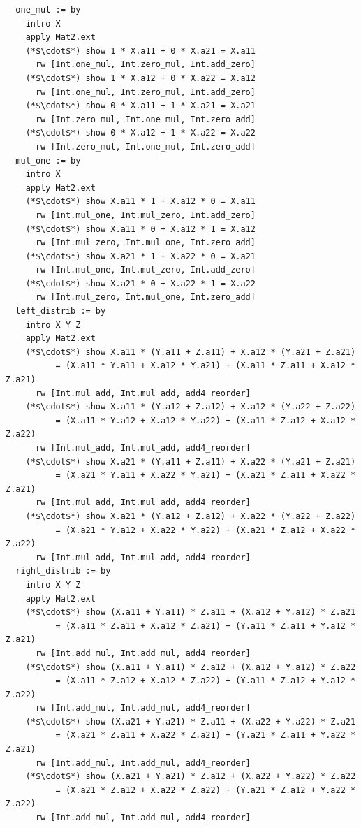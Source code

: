 \begin{lstlisting}
  one_mul := by
    intro X
    apply Mat2.ext
    (*$\cdot$*) show 1 * X.a11 + 0 * X.a21 = X.a11
      rw [Int.one_mul, Int.zero_mul, Int.add_zero]
    (*$\cdot$*) show 1 * X.a12 + 0 * X.a22 = X.a12
      rw [Int.one_mul, Int.zero_mul, Int.add_zero]
    (*$\cdot$*) show 0 * X.a11 + 1 * X.a21 = X.a21
      rw [Int.zero_mul, Int.one_mul, Int.zero_add]
    (*$\cdot$*) show 0 * X.a12 + 1 * X.a22 = X.a22
      rw [Int.zero_mul, Int.one_mul, Int.zero_add]
  mul_one := by
    intro X
    apply Mat2.ext
    (*$\cdot$*) show X.a11 * 1 + X.a12 * 0 = X.a11
      rw [Int.mul_one, Int.mul_zero, Int.add_zero]
    (*$\cdot$*) show X.a11 * 0 + X.a12 * 1 = X.a12
      rw [Int.mul_zero, Int.mul_one, Int.zero_add]
    (*$\cdot$*) show X.a21 * 1 + X.a22 * 0 = X.a21
      rw [Int.mul_one, Int.mul_zero, Int.add_zero]
    (*$\cdot$*) show X.a21 * 0 + X.a22 * 1 = X.a22
      rw [Int.mul_zero, Int.mul_one, Int.zero_add]
  left_distrib := by
    intro X Y Z
    apply Mat2.ext
    (*$\cdot$*) show X.a11 * (Y.a11 + Z.a11) + X.a12 * (Y.a21 + Z.a21)
          = (X.a11 * Y.a11 + X.a12 * Y.a21) + (X.a11 * Z.a11 + X.a12 * Z.a21)
      rw [Int.mul_add, Int.mul_add, add4_reorder]
    (*$\cdot$*) show X.a11 * (Y.a12 + Z.a12) + X.a12 * (Y.a22 + Z.a22)
          = (X.a11 * Y.a12 + X.a12 * Y.a22) + (X.a11 * Z.a12 + X.a12 * Z.a22)
      rw [Int.mul_add, Int.mul_add, add4_reorder]
    (*$\cdot$*) show X.a21 * (Y.a11 + Z.a11) + X.a22 * (Y.a21 + Z.a21)
          = (X.a21 * Y.a11 + X.a22 * Y.a21) + (X.a21 * Z.a11 + X.a22 * Z.a21)
      rw [Int.mul_add, Int.mul_add, add4_reorder]
    (*$\cdot$*) show X.a21 * (Y.a12 + Z.a12) + X.a22 * (Y.a22 + Z.a22)
          = (X.a21 * Y.a12 + X.a22 * Y.a22) + (X.a21 * Z.a12 + X.a22 * Z.a22)
      rw [Int.mul_add, Int.mul_add, add4_reorder]
  right_distrib := by
    intro X Y Z
    apply Mat2.ext
    (*$\cdot$*) show (X.a11 + Y.a11) * Z.a11 + (X.a12 + Y.a12) * Z.a21
          = (X.a11 * Z.a11 + X.a12 * Z.a21) + (Y.a11 * Z.a11 + Y.a12 * Z.a21)
      rw [Int.add_mul, Int.add_mul, add4_reorder]
    (*$\cdot$*) show (X.a11 + Y.a11) * Z.a12 + (X.a12 + Y.a12) * Z.a22
          = (X.a11 * Z.a12 + X.a12 * Z.a22) + (Y.a11 * Z.a12 + Y.a12 * Z.a22)
      rw [Int.add_mul, Int.add_mul, add4_reorder]
    (*$\cdot$*) show (X.a21 + Y.a21) * Z.a11 + (X.a22 + Y.a22) * Z.a21
          = (X.a21 * Z.a11 + X.a22 * Z.a21) + (Y.a21 * Z.a11 + Y.a22 * Z.a21)
      rw [Int.add_mul, Int.add_mul, add4_reorder]
    (*$\cdot$*) show (X.a21 + Y.a21) * Z.a12 + (X.a22 + Y.a22) * Z.a22
          = (X.a21 * Z.a12 + X.a22 * Z.a22) + (Y.a21 * Z.a12 + Y.a22 * Z.a22)
      rw [Int.add_mul, Int.add_mul, add4_reorder]
\end{lstlisting}

